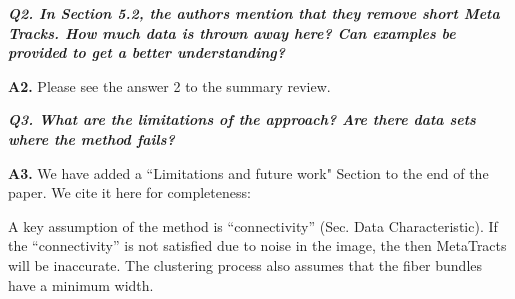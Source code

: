 \documentclass[]{article}
\begin{document}
\makebox[\linewidth]{\rule{0.25\textwidth}{0.4pt}}


\textbf{\textit{
Q2. In Section 5.2, the authors mention that they remove short Meta Tracks.
How much data is thrown away here? Can examples be provided to get a
better understanding?
}}


\textbf{A2.} Please see the answer 2 to the summary review.

\makebox[\linewidth]{\rule{0.25\textwidth}{0.4pt}}


\textbf{\textit{
Q3. What are the limitations of the approach? Are there data sets where the
method fails?
}
}

\textbf{A3.} We have added a ``Limitations and future work" Section to the end of the paper. We cite it here for completeness:

A key assumption of the method is ``connectivity'' (Sec. Data Characteristic).
If the ``connectivity'' is not satisfied due to noise in the image, the then MetaTracts will be inaccurate. 
The clustering process also assumes that the fiber bundles have a minimum width. 


\end{document}
